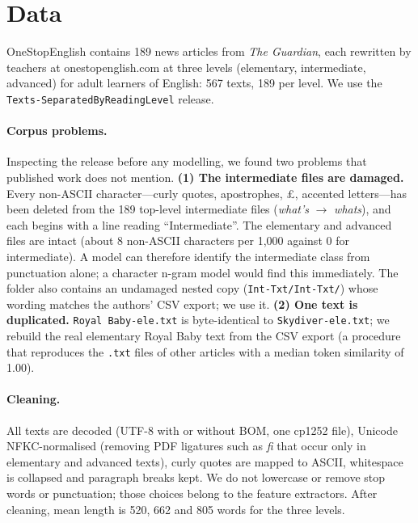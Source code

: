 \section{Data}
\label{sec:data}

OneStopEnglish \citep{vajjala2018onestop} contains 189 news articles from \textit{The Guardian}, each rewritten by teachers at onestopenglish.com at three levels (elementary, intermediate, advanced) for adult learners of English: 567 texts, 189 per level. We use the \texttt{Texts-SeparatedByReadingLevel} release.

\paragraph{Corpus problems.}
Inspecting the release before any modelling, we found two problems that published work does not mention.
\textbf{(1) The intermediate files are damaged.} Every non-ASCII character---curly quotes, apostrophes, \pounds, accented letters---has been deleted from the 189 top-level intermediate files (\textit{what's} $\rightarrow$ \textit{whats}), and each begins with a line reading ``Intermediate''. The elementary and advanced files are intact (about 8 non-ASCII characters per 1,000 against 0 for intermediate). A model can therefore identify the intermediate class from punctuation alone; a character n-gram model would find this immediately. The folder also contains an undamaged nested copy (\texttt{Int-Txt/Int-Txt/}) whose wording matches the authors' CSV export; we use it.
\textbf{(2) One text is duplicated.} \texttt{Royal Baby-ele.txt} is byte-identical to \texttt{Skydiver-ele.txt}; we rebuild the real elementary Royal Baby text from the CSV export (a procedure that reproduces the \texttt{.txt} files of other articles with a median token similarity of 1.00).

\paragraph{Cleaning.}
All texts are decoded (UTF-8 with or without BOM, one cp1252 file), Unicode NFKC-normalised (removing PDF ligatures such as \textit{ﬁ} that occur only in elementary and advanced texts), curly quotes are mapped to ASCII, whitespace is collapsed and paragraph breaks kept. We do not lowercase or remove stop words or punctuation; those choices belong to the feature extractors. After cleaning, mean length is 520, 662 and 805 words for the three levels.

